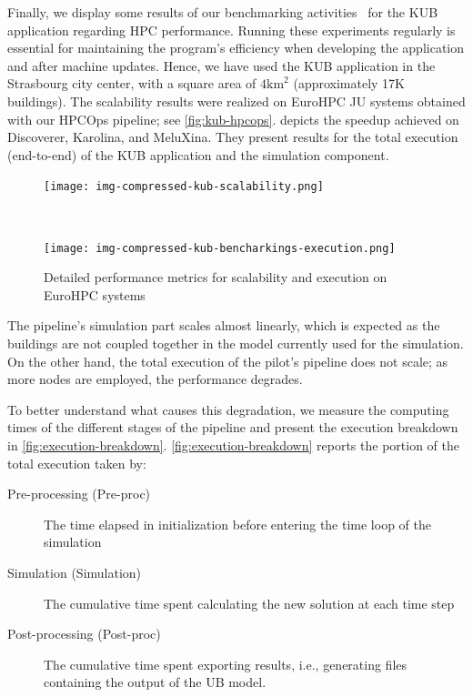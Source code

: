 \documentclass[runningheads]{llncs}
\begin{document}
Finally, we display some results of our benchmarking activities~\cite{hidalgo2_d31_2024} for the KUB application regarding HPC performance.
Running these experiments regularly is essential for maintaining the program's efficiency when developing the application and after machine updates.
Hence, we have used the KUB application in the Strasbourg city center, with a square area of $4 \mathrm{km}^2$ (approximately 17K buildings).
The scalability results were realized on EuroHPC JU systems obtained with our HPCOps pipeline; see \cref{fig:kub-hpcops}.
 depicts the speedup achieved on Discoverer, Karolina, and MeluXina.
They present results for the total execution (end-to-end) of the KUB application and the simulation component.

\begin{figure}  %
  \centering
  \begin{subfloat}{
    \texttt{[image: img-compressed-kub-scalability.png]}
    \label{fig:scalability}
  }\end{subfloat}
  \\
  \begin{subfloat}{
    \texttt{[image: img-compressed-kub-bencharkings-execution.png]}
    \label{fig:execution-breakdown}
  }\end{subfloat}
  \caption{Detailed performance metrics for scalability and execution on EuroHPC systems}
  \label{fig:combined-metrics}
\end{figure}
The pipeline's simulation part scales almost linearly, which is expected as the buildings are not coupled together in the model currently used for the simulation. On the other hand, the total execution of the pilot's pipeline does not scale; as more nodes are employed, the performance degrades.

To better understand what causes this degradation, we measure the computing times of the different stages of the pipeline and present the execution breakdown in \cref{fig:execution-breakdown}. 
\cref{fig:execution-breakdown} reports the portion of the total execution taken by:
\begin{description}
\item[Pre-processing (Pre-proc)] The time elapsed in initialization before entering the time loop of the simulation
\item[Simulation (Simulation)] The cumulative time spent calculating the new solution at each time step
\item[Post-processing (Post-proc)] The cumulative time spent exporting results, i.e., generating files containing the output of the UB model.
\end{description}
\end{document}
